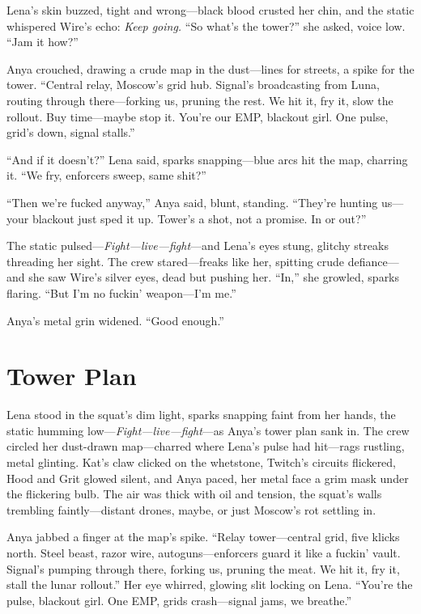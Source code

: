 \documentclass[12pt]{book}
\begin{document}
Lena’s skin buzzed, tight and wrong---black blood crusted her chin, and the static whispered Wire’s echo: \emph{Keep going.} ``So what’s the tower?'' she asked, voice low. ``Jam it how?''

Anya crouched, drawing a crude map in the dust---lines for streets, a spike for the tower. ``Central relay, Moscow’s grid hub. Signal’s broadcasting from Luna, routing through there---forking us, pruning the rest. We hit it, fry it, slow the rollout. Buy time---maybe stop it. You’re our EMP, blackout girl. One pulse, grid’s down, signal stalls.''

``And if it doesn’t?'' Lena said, sparks snapping---blue arcs hit the map, charring it. ``We fry, enforcers sweep, same shit?''

``Then we’re fucked anyway,'' Anya said, blunt, standing. ``They’re hunting us---your blackout just sped it up. Tower’s a shot, not a promise. In or out?''

The static pulsed---\emph{Fight---live---fight}---and Lena’s eyes stung, glitchy streaks threading her sight. The crew stared---freaks like her, spitting crude defiance---and she saw Wire’s silver eyes, dead but pushing her. ``In,'' she growled, sparks flaring. ``But I’m no fuckin’ weapon---I’m me.''

Anya’s metal grin widened. ``Good enough.''

\section{Tower Plan}

Lena stood in the squat’s dim light, sparks snapping faint from her hands, the static humming low---\emph{Fight---live---fight}---as Anya’s tower plan sank in. The crew circled her dust-drawn map---charred where Lena’s pulse had hit---rags rustling, metal glinting. Kat’s claw clicked on the whetstone, Twitch’s circuits flickered, Hood and Grit glowed silent, and Anya paced, her metal face a grim mask under the flickering bulb. The air was thick with oil and tension, the squat’s walls trembling faintly---distant drones, maybe, or just Moscow’s rot settling in.

Anya jabbed a finger at the map’s spike. ``Relay tower---central grid, five klicks north. Steel beast, razor wire, autoguns---enforcers guard it like a fuckin’ vault. Signal’s pumping through there, forking us, pruning the meat. We hit it, fry it, stall the lunar rollout.'' Her eye whirred, glowing slit locking on Lena. ``You’re the pulse, blackout girl. One EMP, grids crash---signal jams, we breathe.''
\end{document}
